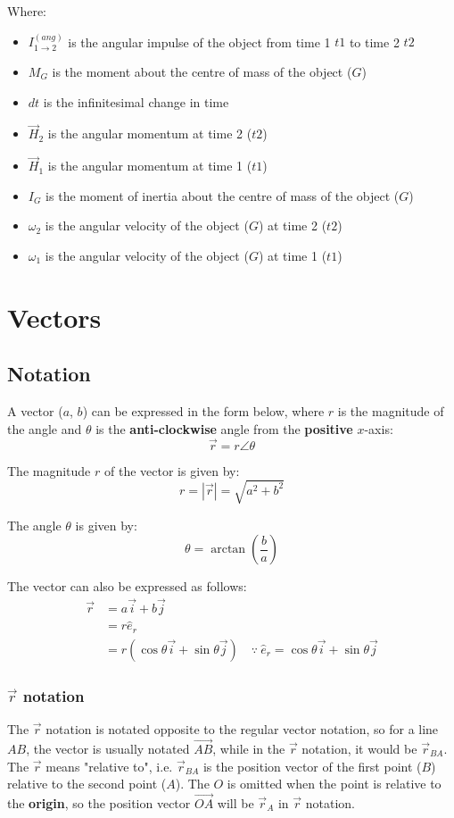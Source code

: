 \documentclass[11pt]{article}
\begin{document}
Where:
\begin{itemize}
\item \(I_{1 \rightarrow 2}^{(ang)}\) is the angular impulse of the object from time 1 \(t1\) to time 2 \(t2\)
\item \(M_G\) is the moment about the centre of mass of the object (\(G\))
\item \(dt\) is the infinitesimal change in time
\item \(\vec{H}_2\) is the angular momentum at time 2 (\(t2\))
\item \(\vec{H}_1\) is the angular momentum at time 1 (\(t1\))
\item \(I_G\) is the moment of inertia about the centre of mass of the object (\(G\))
\item \(\omega_{2}\) is the angular velocity of the object (\(G\)) at time 2 (\(t2\))
\item \(\omega_{1}\) is the angular velocity of the object (\(G\)) at time 1 (\(t1\))
\end{itemize}

 \newpage

\section{Vectors}
\label{sec:orgbbbb142}

\subsection{Notation}
\label{sec:org10b56e7}
A vector (\(a\), \(b\)) can be expressed in the form below, where \(r\) is the magnitude of the angle and \(\theta\) is the \textbf{anti-clockwise} angle from the \textbf{positive} \(x\)-axis:
\[\vec{r} = r \angle \theta\]

The magnitude \(r\) of the vector is given by:
\[r = \left| \vec{r} \right| = \sqrt{a^2 + b^2}\]

The angle \(\theta\) is given by:
\[\theta = \arctan \left( \frac{b}{a} \right)\]

The vector can also be expressed as follows:
\begin{align*}
\vec{r} &= a \vec{i} + b \vec{j} \\
&= r \hat{e}_r \\
&= r \left( \cos \theta \vec{i} + \sin \theta \vec{j} \right) \quad \because \ \hat{e}_r = \cos \theta \vec{i} + \sin \theta \vec{j}
\end{align*}

\subsubsection{\(\vec{r}\) notation}
\label{sec:org508aedc}
The \(\vec{r}\) notation is notated opposite to the regular vector notation, so for a line \(AB\), the vector is usually notated \(\overrightarrow{AB}\), while in the \(\vec{r}\) notation, it would be \(\vec{r}_{BA}\). The \(\vec{r}\) means "relative to", i.e. \(\vec{r}_{BA}\) is the position vector of the first point (\(B\)) relative to the second point (\(A\)). The \(O\) is omitted when the point is relative to the \textbf{origin}, so the position vector \(\overrightarrow{OA}\) will be \(\vec{r}_A\) in \(\vec{r}\) notation.
\end{document}
